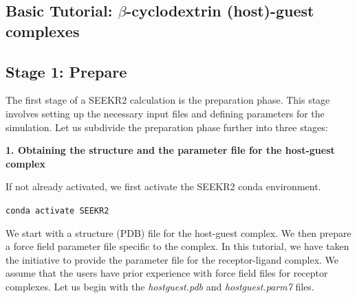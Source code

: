 \documentclass[9pt,training,pubversion]{livecoms}
\begin{document}
\subsection{Basic Tutorial: $\beta$-cyclodextrin (host)-guest complexes} \label{host_guest}
\vspace{2mm}

\subsection*{Stage 1: Prepare}
\vspace{2mm}

\noindent The first stage of a SEEKR2 calculation is the preparation phase. This stage involves setting up the necessary input files and defining parameters for the simulation. Let us subdivide the preparation phase further into three stages:

\vspace{2mm}
\noindent \textbf{1. Obtaining the structure and the parameter file for the host-guest complex} \par
\vspace{2mm}


\noindent If not already activated, we first activate the SEEKR2 conda environment. 

\begin{tcolorbox}[colback=black!8!white, colframe=black!50!black, fontlower=\tiny, left=2pt, right=2pt, top=2pt, bottom=2pt] 
\texttt{conda activate SEEKR2}
\end{tcolorbox}

\noindent We start with a structure (PDB) file for the host-guest complex. We then prepare a force field parameter file specific to the complex. In this tutorial, we have taken the initiative to provide the parameter file for the receptor-ligand complex. We assume that the users have prior experience with force field files for receptor complexes. Let us begin with the \textit{hostguest.pdb} and \textit{hostguest.parm7} files.  \par
\end{document}
